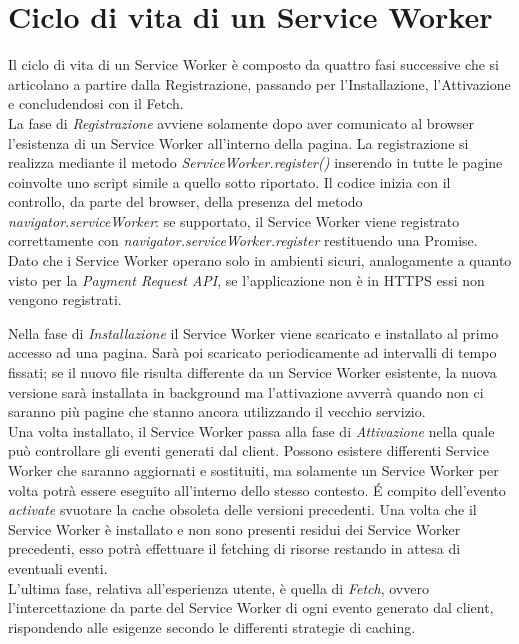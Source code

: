 \documentclass[12pt ,a4paper , twoside , openright ]{book}
\begin{document}
	\section{Ciclo di vita di un Service Worker}
	Il ciclo di vita di un Service Worker\cite{rif20, rif21, rif26} è composto da quattro fasi successive che si articolano a partire dalla Registrazione, passando per l'Installazione, l'Attivazione e concludendosi con il Fetch. \\
	La fase di \textit{Registrazione} avviene solamente dopo aver comunicato al browser l'esistenza di un Service Worker all'interno della pagina. La registrazione si realizza mediante il metodo \textit{ServiceWorker.register()} inserendo in tutte le pagine coinvolte uno script simile a quello sotto riportato. Il codice inizia con il controllo, da parte del browser, della presenza del metodo \textit{navigator.serviceWorker}: se supportato, il Service Worker viene registrato correttamente con \textit{navigator.serviceWorker.register} restituendo una Promise. Dato che i Service Worker operano solo in ambienti sicuri, analogamente a quanto visto per la \textit{Payment Request API}, se l'applicazione non è in HTTPS essi non vengono registrati.
	
	Nella fase di \textit{Installazione} il Service Worker viene scaricato e installato al primo accesso ad una pagina. Sarà poi scaricato periodicamente ad intervalli di tempo fissati; se il nuovo file risulta differente da un Service Worker esistente, la nuova versione sarà installata in background ma l'attivazione avverrà quando non ci saranno più pagine che stanno ancora utilizzando il vecchio servizio. \\
	Una volta installato, il Service Worker passa alla fase di \textit{Attivazione} nella quale può controllare gli eventi generati dal client. Possono esistere differenti Service Worker che saranno aggiornati e sostituiti, ma solamente un Service Worker per volta potrà essere eseguito all'interno dello stesso contesto. \'E compito dell'evento \textit{activate} svuotare la cache obsoleta delle versioni precedenti. Una volta che il Service Worker è installato e non sono presenti residui dei Service Worker precedenti, esso potrà effettuare il fetching di risorse restando in attesa di eventuali eventi. \\
	L'ultima fase, relativa all'esperienza utente, è quella di \textit{Fetch}, ovvero l'intercettazione da parte del Service Worker di ogni evento generato dal client, rispondendo alle esigenze secondo le differenti strategie di caching. 
\end{document}
